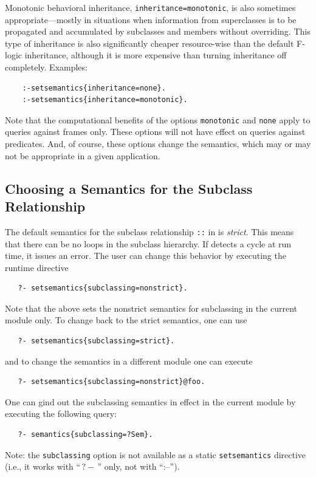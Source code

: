 \documentclass[11pt]{article}
\newcommand{\ERGO}{\mbox{\smaller{\ensuremath{\cal{E}}\smaller{{\sc{RGO}}}}}\xspace}
\newcommand{\FLSYSTEM}{\ERGO}
\newcommand{\query}{\mbox{$\, ?\! - \, $}}                  %
\newcommand{\fl}{\mbox{F-logic}\xspace}
\begin{document}
Monotonic behavioral inheritance, \texttt{inheritance=monotonic}, is also sometimes
appropriate---mostly in situations when information from superclasses is to
be propagated and accumulated by subclasses and members without overriding.
This type of inheritance is also significantly cheaper resource-wise than
the default \fl inheritance, although it is more expensive than turning inheritance
off completely.
Examples:
\begin{verbatim}
    :-setsemantics{inheritance=none}.
    :-setsemantics{inheritance=monotonic}.
\end{verbatim}
Note that the computational benefits of the options \texttt{monotonic} and 
\texttt{none} apply to queries against frames only.
These options will not have effect on queries against predicates.
And, of course, these options change the semantics, which may or may not be
appropriate in a given application.


\subsection{Choosing a Semantics for the Subclass Relationship}

The default semantics for the subclass relationship \texttt{::} in
\FLSYSTEM is \emph{strict}. This means that there can be no loops in the
subclass hierarchy. If \FLSYSTEM detects a cycle at run time, it issues an
error.  The user can change this behavior by executing the runtime directive
\begin{verbatim}
   ?- setsemantics{subclassing=nonstrict}.
\end{verbatim}
Note that the above sets the nonstrict semantics for subclassing in the
current module only. To change back to the strict semantics, one can use
\begin{verbatim}
   ?- setsemantics{subclassing=strict}.
\end{verbatim}
and to change the semantics in a different module one can execute
\begin{verbatim}
   ?- setsemantics{subclassing=nonstrict}@foo.
\end{verbatim}

One can gind out the subclassing semantics in effect in the current module
by executing the following query:
\begin{verbatim}
   ?- semantics{subclassing=?Sem}.
\end{verbatim}
Note: the \texttt{subclassing} option is not available as a static
\texttt{setsemantics} directive (i.e., it works with ``$\query$'' only,
not with ``:--'').
\end{document}
